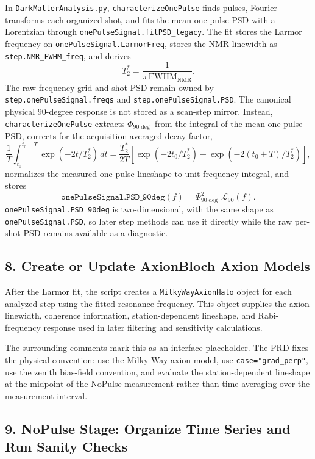\documentclass[11pt]{article}
\newcommand{\code}[1]{\texttt{#1}}
\newcommand{\file}[1]{\texttt{#1}}
\begin{document}
In \file{DarkMatterAnalysis.py}, \code{characterizeOnePulse} finds pulses,
Fourier-transforms each organized shot, and fits the mean one-pulse PSD with a
Lorentzian through \code{onePulseSignal.fitPSD\_legacy}. The fit stores the
Larmor frequency on \code{onePulseSignal.LarmorFreq}, stores the NMR linewidth
as \code{step.NMR\_FWHM\_freq}, and derives
\[
  T_2^* = \frac{1}{\pi\,\mathrm{FWHM}_{\mathrm{NMR}}}.
\]
The raw frequency grid and shot PSD remain owned by
\code{step.onePulseSignal.freqs} and \code{step.onePulseSignal.PSD}. The
canonical physical 90-degree response is not stored as a scan-step mirror.
Instead, \code{characterizeOnePulse} extracts \(\Phi_{90\deg}\) from the
integral of the mean one-pulse PSD, corrects for the acquisition-averaged
decay factor,
\[
  \frac{1}{T}\int_{t_0}^{t_0+T}\exp(-2t/T_2^*)\,dt
  =
  \frac{T_2^*}{2T}
  \left[
    \exp(-2t_0/T_2^*)-\exp(-2(t_0+T)/T_2^*)
  \right],
\]
normalizes the measured one-pulse lineshape to unit frequency integral, and
stores
\[
  \code{onePulseSignal.PSD\_90deg}(f)
  =
  \Phi_{90\deg}^2\,\mathcal{L}_{90}(f).
\]
\code{onePulseSignal.PSD\_90deg} is two-dimensional, with the same shape as
\code{onePulseSignal.PSD}, so later step methods can use it directly while the
raw per-shot PSD remains available as a diagnostic.

\subsection{8. Create or Update AxionBloch Axion Models}

After the Larmor fit, the script creates a \code{MilkyWayAxionHalo} object for
each analyzed step using the fitted resonance frequency. This object supplies
the axion linewidth, coherence information, station-dependent lineshape, and
Rabi-frequency response used in later filtering and sensitivity calculations.

The surrounding comments mark this as an interface placeholder. The PRD fixes
the physical convention: use the Milky-Way axion model, use
\code{case="grad\_perp"}, use the zenith bias-field convention, and evaluate the
station-dependent lineshape at the midpoint of the NoPulse measurement rather
than time-averaging over the measurement interval.

\subsection{9. NoPulse Stage: Organize Time Series and Run Sanity Checks}
\end{document}
